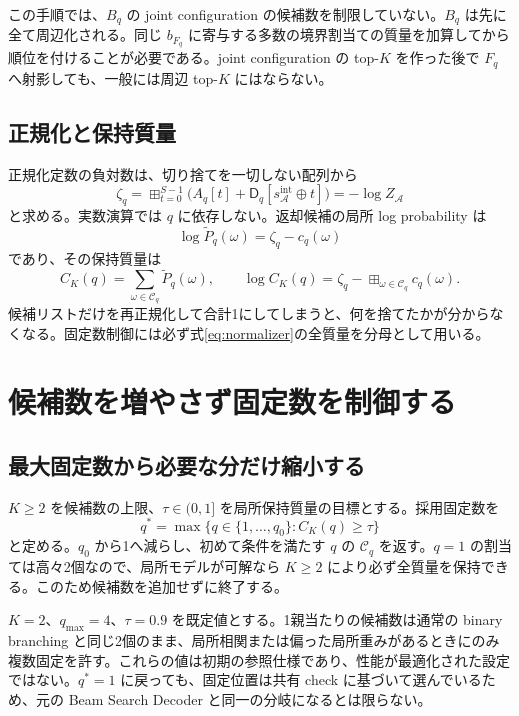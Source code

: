\documentclass[a4paper,11pt]{ltjsarticle}
\numberwithin{equation}{section}
\theoremstyle{definition}
\newcommand{\A}{\mathcal A}
\begin{document}
この手順では、$B_q$ の joint configuration の候補数を制限していない。$B_q$ は先に全て周辺化される。同じ $b_{F_q}$ に寄与する多数の境界割当ての質量を加算してから順位を付けることが必要である。joint configuration の top-$K$ を作った後で $F_q$ へ射影しても、一般には周辺 top-$K$ にはならない。

\subsection{正規化と保持質量}
正規化定数の負対数は、切り捨てを一切しない配列から
\begin{equation}
 \zeta_q=\mathop{\boxplus}_{t=0}^{S-1}
                  \bigl(A_q[t]+\mathsf D_q[s_\A^{\mathrm{int}}\oplus t]\bigr)
       =-\log Z_\A
 \label{eq:normalizer}
\end{equation}
と求める。実数演算では $q$ に依存しない。返却候補の局所 log probability は
\begin{equation}
 \log\widetilde P_q(\omega)=\zeta_q-c_q(\omega)
 \label{eq:normalized-cost}
\end{equation}
であり、その保持質量は
\begin{equation}
 C_K(q)=\sum_{\omega\in\mathcal C_q}\widetilde P_q(\omega),
 \qquad
 \log C_K(q)=\zeta_q-
                \mathop{\boxplus}_{\omega\in\mathcal C_q}c_q(\omega).
 \label{eq:coverage}
\end{equation}
候補リストだけを再正規化して合計1にしてしまうと、何を捨てたかが分からなくなる。固定数制御には必ず式\eqref{eq:normalizer}の全質量を分母として用いる。

\section{候補数を増やさず固定数を制御する}
\subsection{最大固定数から必要な分だけ縮小する}
$K\ge2$ を候補数の上限、$\tau\in(0,1]$ を局所保持質量の目標とする。採用固定数を
\begin{equation}
 q^*=\max\{q\in\{1,\ldots,q_0\}:C_K(q)\ge\tau\}
 \label{eq:q-selection}
\end{equation}
と定める。$q_0$ から1へ減らし、初めて条件を満たす $q$ の $\mathcal C_q$ を返す。$q=1$ の割当ては高々2個なので、局所モデルが可解なら $K\ge2$ により必ず全質量を保持できる。このため候補数を追加せずに終了する。

$K=2$、$q_{\max}=4$、$\tau=0.9$ を既定値とする。1親当たりの候補数は通常の binary branching と同じ2個のまま、局所相関または偏った局所重みがあるときにのみ複数固定を許す。これらの値は初期の参照仕様であり、性能が最適化された設定ではない。$q^*=1$ に戻っても、固定位置は共有 check に基づいて選んでいるため、元の Beam Search Decoder と同一の分岐になるとは限らない。
\end{document}
